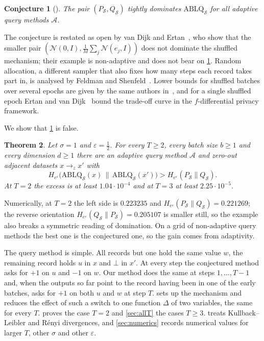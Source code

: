 \documentclass[11pt]{amsart}
\newtheorem{theorem}{Theorem}[section]
\newtheorem{conjecture}[theorem]{Conjecture}
\theoremstyle{definition}
\theoremstyle{remark}
\newcommand{\N}{\mathcal N}
\newcommand{\He}{H_{e^{\varepsilon}}}
\begin{document}
\begin{conjecture}[{\cite[Conjecture~3.2]{CGKKMSZ24}}]\label{conj:CGKKMSZ}
The pair $(P_{\mathcal S},Q_{\mathcal S})$ tightly dominates $\mathrm{ABLQ}_{\mathcal S}$ for all adaptive query methods $\mathcal A$.
\end{conjecture}

The conjecture is restated as open by van Dijk and Ertan~\cite[Appendix~J]{vDE26}, who show that the smaller pair $(\N(0,I),\frac1M\sum_j\N(e_j,I))$ does not dominate the shuffled mechanism; their example is non-adaptive and does not bear on \cref{conj:CGKKMSZ}. Random allocation, a different sampler that also fixes how many steps each record takes part in, is analysed by Feldman and Shenfeld~\cite{FS25}. Lower bounds for shuffled batches over several epochs are given by the same authors in~\cite{CGKKMSZ24b}, and for a single shuffled epoch Ertan and van Dijk~\cite{EvD26} bound the trade-off curve in the $f$-differential privacy framework.

We show that \cref{conj:CGKKMSZ} is false.

\begin{theorem}\label{thm:main}
Let $\sigma=1$ and $\varepsilon=\frac12$. For every $T\ge2$, every batch size $b\ge1$ and every dimension $d\ge1$ there are an adaptive query method $\mathcal A$ and zero-out adjacent datasets $x\to_z x'$ with
\[
\He\bigl(\mathrm{ABLQ}_{\mathcal S}(x)\,\big\|\,\mathrm{ABLQ}_{\mathcal S}(x')\bigr)>\He(P_{\mathcal S}\|Q_{\mathcal S}).
\]
At $T=2$ the excess is at least $1.04\cdot10^{-4}$ and at $T=3$ at least $2.25\cdot10^{-5}$.
\end{theorem}

Numerically, at $T=2$ the left side is $0.223235$ and $\He(P_{\mathcal S}\|Q_{\mathcal S})=0.221269$; the reverse orientation $\He(Q_{\mathcal S}\|P_{\mathcal S})=0.205107$ is smaller still, so the example also breaks a symmetric reading of domination. On a grid of non-adaptive query methods the best one is the conjectured one, so the gain comes from adaptivity.

The query method is simple. All records but one hold the same value $w$, the remaining record holds $u$ in $x$ and $\bot$ in $x'$. At every step the conjectured method asks for $+1$ on $u$ and $-1$ on $w$. Our method does the same at steps $1,\dots,T-1$ and, when the outputs so far point to the record having been in one of the early batches, asks for $+1$ on both $u$ and $w$ at step $T$.  sets up the mechanism and reduces the effect of such a switch to one function $\Delta$ of two variables, the same for every $T$.  proves the case $T=2$ and \cref{sec:allT} the cases $T\ge3$.  treats Kullback--Leibler and R\'enyi divergences, and \cref{sec:numerics} records numerical values for larger $T$, other $\sigma$ and other $\varepsilon$.
\end{document}
